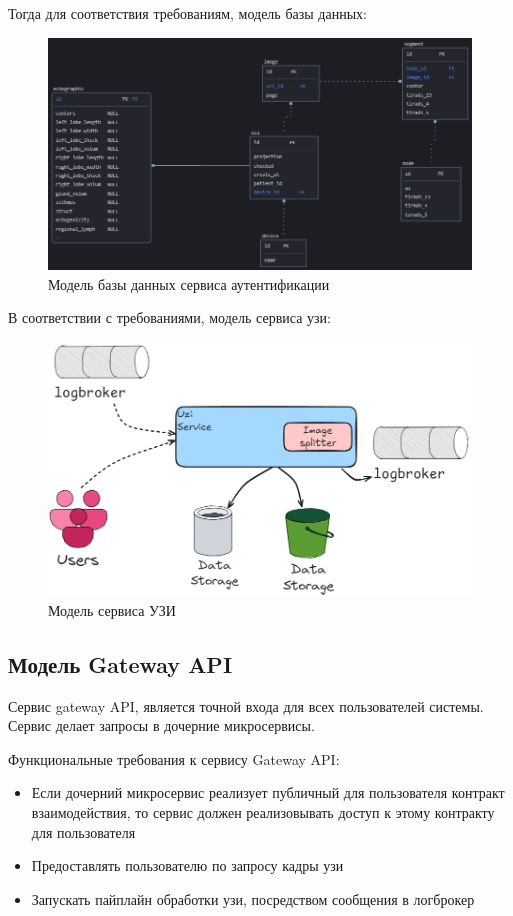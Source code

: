 Тогда для соответствия требованиям, модель базы данных:
\begin{figure}[H]%
	\begin{center}
		\includegraphics[width=.9\columnwidth]{./img/uzi_db_model.png}%
	\end{center}
	\caption{Модель базы данных сервиса аутентификации}%
	\label{pic:auth_db}%
\end{figure}


В соответствии с требованиями, модель сервиса узи:
\begin{figure}[H]%
	\begin{center}
		\includegraphics[width=.6\columnwidth]{./img/uzi_model.png}%
	\end{center}
	\caption{Модель сервиса УЗИ}%
	\label{pic:auth_model}%
\end{figure}


\subsection{Модель Gateway API}
Сервис gateway API, является точной входа для всех пользователей системы. Сервис делает запросы в дочерние микросервисы.


Функциональные требования к сервису Gateway API:
\begin{itemize}
  \item Если дочерний микросервис реализует публичный для пользователя контракт взаимодействия, то сервис должен реализовывать доступ к этому контракту для пользователя
  \item Предоставлять пользователю по запросу кадры узи
  \item Запускать пайплайн обработки узи, посредством сообщения в логброкер
\end{itemize}


